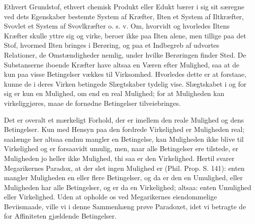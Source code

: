 \documentclass[12pt,a4paper]{book}
\begin{document}
Ethvert Grundstof, ethvert chemisk Produkt eller Edukt bærer i
sig sit særegne ved dets Egenskaber bestemte System af Kræfter,
Ilten et System af Iltkræfter, Svovlet et System af Svovlkræfter
o. s. v. Om, hvorvidt og hvorledes Iltens Kræfter skulle yttre sig
og virke, beroer ikke paa Ilten alene, men tillige paa det Stof,
hvormed Ilten bringes i Berøring, og paa et Indbegreb af udvortes
Relationer, de Omstændigheder nemlig, under hvilke Berøringen
finder Sted. De Substanserne iboende Kræfter have altsaa en Væren
efter
Mulighed, saa at de kun paa visse Betingelser vækkes til
Virksomhed. Hvorledes dette er at forstaae, kunne de i deres Virken
betingede Slægtskaber tydelig vise. Slægtskabet i og for sig er kun
en Mulighed, om end en real Mulighed; for at Muligheden kan
virkeliggjøres, maae de fornødne Betingelser tilveiebringes.

Det er overalt et mærkeligt Forhold, der er imellem den reale
Mulighed og dens Betingelser. Kun med Hensyn paa den fordrede
Virkelighed er Muligheden real; saalænge her altsaa endnu mangler
en Betingelse, kan Muligheden ikke blive til Virkelighed og er
forsaavidt umulig, men, naar alle Betingelser ere tilstede, er
Muligheden jo heller ikke Mulighed, thi saa er den Virkelighed.
Hertil svarer Megarikernes Paradox, at der slet ingen Mulighed er
(Phil. Prop. S. 141): enten mangler Muligheden en eller flere
Betingelser, og da er den en Umulighed, eller Muligheden har alle
Betingelser, og er da en Virkelighed; altsaa: enten Umulighed eller
Virkelighed. Uden at opholde os ved Megarikernes eiendommelige
Beviismaade, ville vi i denne Sammenhæng prøve Paradoxet, idet vi
betragte de for Affiniteten gjældende Betingelser.
\end{document}
